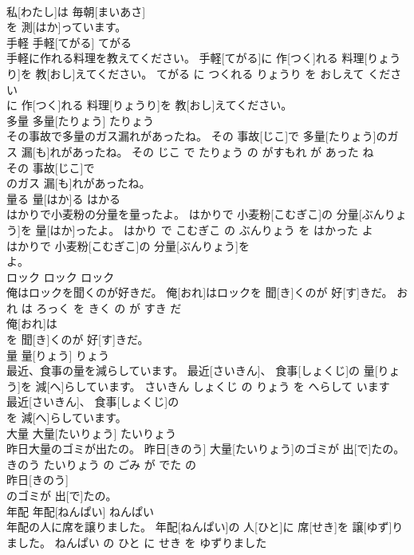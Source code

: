 \documentclass[8pt]{extreport}
\begin{document}
\begin{CJK}{UTF8}{min}
\\	私[わたし]は 毎朝[まいあさ]
\\	を 測[はか]っています。			
\\	手軽	手軽[てがる]	てがる	
\\	手軽に作れる料理を教えてください。	手軽[てがる]に 作[つく]れる 料理[りょうり]を 教[おし]えてください。	てがる に つくれる りょうり を おしえて ください	
\\	に 作[つく]れる 料理[りょうり]を 教[おし]えてください。			
\\	多量	多量[たりょう]	たりょう	
\\	その事故で多量のガス漏れがあったね。	その 事故[じこ]で 多量[たりょう]のガス 漏[も]れがあったね。	その じこ で たりょう の がすもれ が あった ね	
\\	その 事故[じこ]で
\\	のガス 漏[も]れがあったね。			
\\	量る	量[はか]る	はかる	
\\	はかりで小麦粉の分量を量ったよ。	はかりで 小麦粉[こむぎこ]の 分量[ぶんりょう]を 量[はか]ったよ。	はかり で こむぎこ の ぶんりょう を はかった よ	
\\	はかりで 小麦粉[こむぎこ]の 分量[ぶんりょう]を
\\	よ。			
\\	ロック	ロック	ロック	
\\	俺はロックを聞くのが好きだ。	俺[おれ]はロックを 聞[き]くのが 好[す]きだ。	おれ は ろっく を きく の が すき だ	
\\	俺[おれ]は
\\	を 聞[き]くのが 好[す]きだ。			
\\	量	量[りょう]	りょう	
\\	最近、食事の量を減らしています。	最近[さいきん]、 食事[しょくじ]の 量[りょう]を 減[へ]らしています。	さいきん しょくじ の りょう を へらして います	
\\	最近[さいきん]、 食事[しょくじ]の
\\	を 減[へ]らしています。			
\\	大量	大量[たいりょう]	たいりょう	
\\	昨日大量のゴミが出たの。	昨日[きのう] 大量[たいりょう]のゴミが 出[で]たの。	きのう たいりょう の ごみ が でた の	
\\	昨日[きのう]
\\	のゴミが 出[で]たの。			
\\	年配	年配[ねんぱい]	ねんぱい	
\\	年配の人に席を譲りました。	年配[ねんぱい]の 人[ひと]に 席[せき]を 譲[ゆず]りました。	ねんぱい の ひと に せき を ゆずりました	

\end{CJK}
\end{document}
